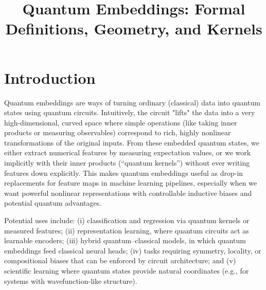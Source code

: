 \documentclass[11pt]{article}
\title{Quantum Embeddings: Formal Definitions, Geometry, and Kernels}
\author{}
\date{}
\begin{document}
\maketitle

\section{Introduction}

Quantum embeddings are ways of turning ordinary (classical) data into quantum states using quantum circuits. Intuitively, the circuit "lifts" the data into a very high-dimensional, curved space where simple operations (like taking inner products or measuring observables) correspond to rich, highly nonlinear transformations of the original inputs. From these embedded quantum states, we either extract numerical features by measuring expectation values, or we work implicitly with their inner products (``quantum kernels'') without ever writing features down explicitly. This makes quantum embeddings useful as drop-in replacements for feature maps in machine learning pipelines, especially when we want powerful nonlinear representations with controllable inductive biases and potential quantum advantages.

Potential uses include: (i) classification and regression via quantum kernels or measured features; (ii) representation learning, where quantum circuits act as learnable encoders; (iii) hybrid quantum--classical models, in which quantum embeddings feed classical neural heads; (iv) tasks requiring symmetry, locality, or compositional biases that can be enforced by circuit architecture; and (v) scientific learning where quantum states provide natural coordinates (e.g., for systems with wavefunction-like structure).
\end{document}
